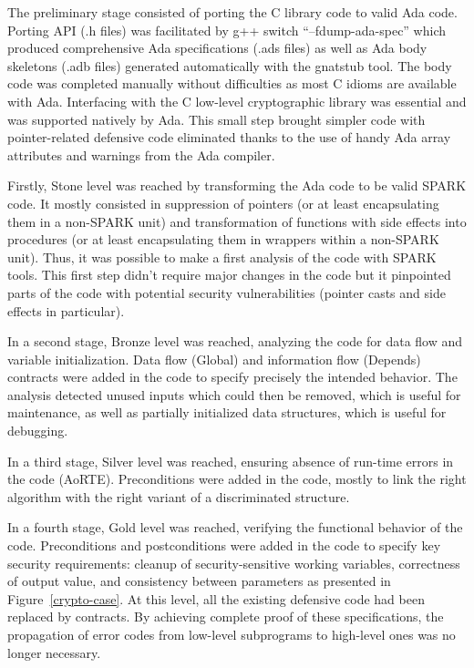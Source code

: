 \documentclass{eceasst}
\begin{document}
The preliminary stage consisted of porting the C library code to valid Ada
code. Porting API (.h files) was facilitated by g++ switch ``–fdump-ada-spec''
which produced comprehensive Ada specifications (.ads files) as well as Ada
body skeletons (.adb files) generated automatically with the gnatstub tool. The
body code was completed manually without difficulties as most C idioms are
available with Ada. Interfacing with the C low-level cryptographic library was
essential and was supported natively by Ada. This small step brought
simpler code with pointer-related defensive code eliminated thanks to the use
of handy Ada array attributes and warnings from the Ada compiler.

Firstly, Stone level was reached by transforming the Ada code to be valid SPARK
code. It mostly consisted in suppression of pointers (or at least encapsulating
them in a non-SPARK unit) and transformation of functions with side effects
into procedures (or at least encapsulating them in wrappers within a non-SPARK
unit). Thus, it was possible to make a first analysis of the code with SPARK
tools. This first step didn't require major changes in the code but it
pinpointed parts of the code with potential security vulnerabilities
(pointer casts and side effects in particular).

In a second stage, Bronze level was reached, analyzing the code for data flow
and variable initialization. Data flow (Global) and information flow (Depends)
contracts were added in the code to specify precisely the intended
behavior. The analysis detected unused inputs which could then be removed,
which is useful for maintenance, as well as partially initialized data
structures, which is useful for debugging.

In a third stage, Silver level was reached, ensuring absence of run-time errors
in the code (AoRTE). Preconditions were added in the code, mostly to link the
right algorithm with the right variant of a discriminated structure.

In a fourth stage, Gold level was reached, verifying the functional behavior of
the code.  Preconditions and postconditions were added in the code to specify key
security requirements: cleanup of security-sensitive working variables,
correctness of output value, and consistency between parameters as presented in
Figure~\ref{crypto-case}. At this level, all
the existing defensive code had been replaced by contracts. By achieving
complete proof of these specifications, the propagation of error codes from low-level
subprograms to high-level ones was no longer necessary.
\end{document}
